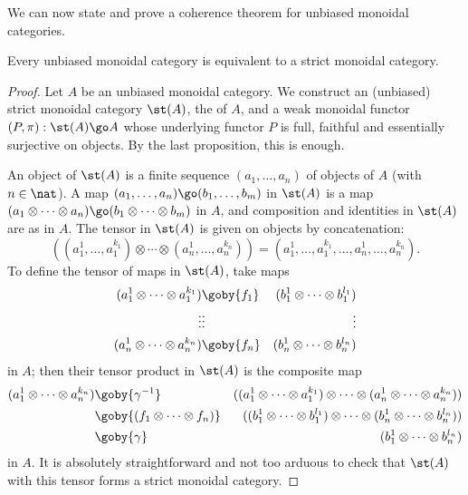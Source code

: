 We can now state and prove a coherence%
%
%
theorem for unbiased
monoidal categories.
% 
\begin{thm}	
Every unbiased monoidal category is equivalent to a strict monoidal category.
\end{thm}
% 
\begin{proof}
Let $A$ be an unbiased monoidal category.  We construct an (unbiased)
strict monoidal category $\st(A)$,%
% 
% 
the  of $A$, and a
weak monoidal functor $(P, \pi): \st(A) \go A$ whose underlying functor $P$
is full, faithful and essentially surjective on objects.  By the last
proposition, this is enough.

An object of $\st(A)$ is a finite sequence $(a_1, \ldots, a_n)$ of objects
of $A$ (with $n\in\nat$).  A map $(a_1, \ldots, a_n) \go (b_1, \ldots,
b_m)$ in $\st(A)$ is a map $(a_1 \otimes\cdots\otimes a_n) \go (b_1
\otimes\cdots\otimes b_m)$ in $A$, and composition and identities in
$\st(A)$ are as in $A$.  The tensor in $\st(A)$ is given on objects by
concatenation: 
\[
((a_1^1, \ldots, a_1^{k_1}) \otimes\cdots\otimes (a_n^1, \ldots,
a_n^{k_n}))
=
(a_1^1, \ldots, a_1^{k_1}, \ldots, a_n^1, \ldots, a_n^{k_n}).
\]
To define the tensor of maps in $\st(A)$, take maps 
%
\begin{eqnarray*}
(a_1^1 \otimes\cdots\otimes a_1^{k_1})	&
\goby{f_1}				&
(b_1^1 \otimes\cdots\otimes b_1^{l_1})	\\
\vdots	&\vdots	&\vdots	\\
(a_n^1 \otimes\cdots\otimes a_n^{k_n})	&
\goby{f_n}				&
(b_n^1 \otimes\cdots\otimes b_n^{l_n})
\end{eqnarray*}
%
in $A$; then their tensor product in $\st(A)$ is the composite map
%
\begin{eqnarray*}
(a_1^1 \otimes\cdots\otimes a_n^{k_n})	&
\goby{\gamma^{-1}}			&
((a_1^1 \otimes\cdots\otimes a_1^{k_1}) \otimes\cdots\otimes (a_n^1
\otimes\cdots\otimes a_n^{k_n}))	\\
					&
\goby{(f_1 \otimes\cdots\otimes f_n)}	&
((b_1^1 \otimes\cdots\otimes b_1^{l_1}) \otimes\cdots\otimes (b_n^1
\otimes\cdots\otimes b_n^{l_n}))	\\
					&
\goby{\gamma}				&
(b_1^1 \otimes\cdots\otimes b_n^{l_n})
\end{eqnarray*}
%
in $A$.  It is absolutely straightforward and not too arduous to check that
$\st(A)$ with this tensor forms a strict monoidal category.  


\end{proof}
